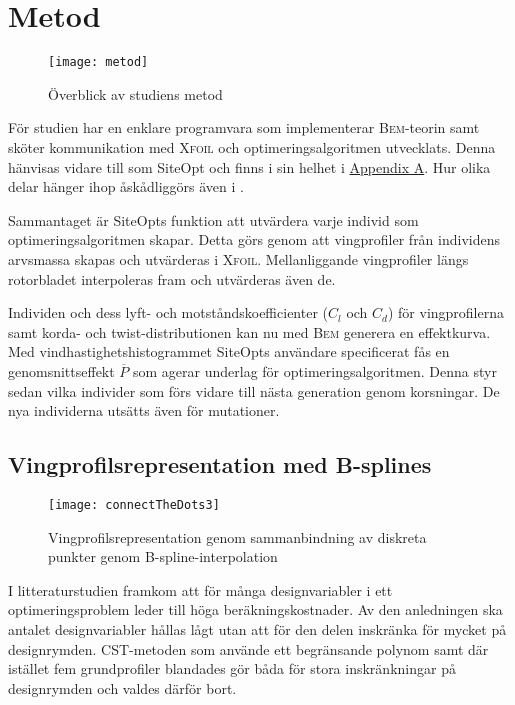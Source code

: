 \chapter{Metod} \label{Chapter:Metod}

\begin{sidewaysfigure}
  \centering{}%
  \texttt{[image: metod]}
  \caption{Överblick av studiens metod}
  \label{metod}
\end{sidewaysfigure}

För studien har en enklare programvara som implementerar \textsc{Bem}-teorin samt sköter kommunikation med \textsc{Xfoil} och optimeringsalgoritmen utvecklats. Denna hänvisas vidare till som SiteOpt och finns i sin helhet i \hyperref[Chapter:kallkod]{Appendix A}. Hur olika delar hänger ihop åskådliggörs även i .

Sammantaget är SiteOpts funktion att utvärdera varje individ som optimeringsalgoritmen skapar. Detta görs genom att vingprofiler från individens arvsmassa skapas och utvärderas i \textsc{Xfoil}. Mellanliggande vingprofiler längs rotorbladet interpoleras fram och utvärderas även de. 

Individen och dess lyft- och motståndskoefficienter ($C_l$ och $C_d$) för vingprofilerna samt korda- och twist-distributionen kan nu med \textsc{Bem} generera en effektkurva. Med vindhastighetshistogrammet SiteOpts användare specificerat fås en genomsnittseffekt $\overline{P}$ som agerar underlag för optimeringsalgoritmen. Denna styr sedan vilka individer som förs vidare till nästa generation genom korsningar. De nya individerna utsätts även för mutationer.

\pagebreak 

\section{Vingprofilsrepresentation med B-splines}
\label{b-splines}

\begin{figure}[!htb]
  \centering
  \texttt{[image: connectTheDots3]}
  \caption{Vingprofilsrepresentation genom sammanbindning av diskreta punkter genom B-spline-interpolation}
  \label{connectTheDots2}
\end{figure}

I litteraturstudien framkom att för många designvariabler i ett optimeringsproblem leder till höga beräkningskostnader. Av den anledningen ska antalet designvariabler hållas lågt utan att för den delen inskränka för mycket på designrymden. CST-metoden \citep{CST} som använde ett begränsande polynom samt \citet{Cencelli} där istället fem grundprofiler blandades gör båda för stora inskränkningar på designrymden och valdes därför bort.

